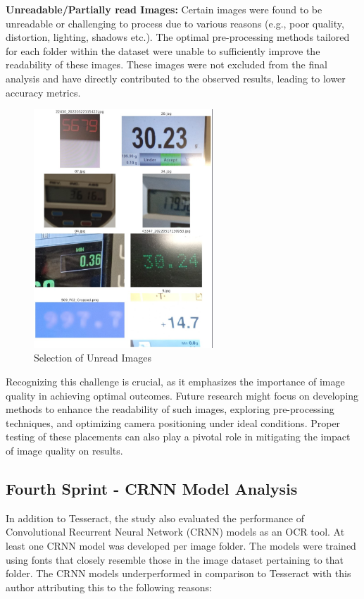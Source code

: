 \textbf{Unreadable/Partially read Images:} Certain images were found to be unreadable or challenging to process due to various reasons (e.g., poor quality, distortion, lighting, shadows etc.). The optimal pre-processing methods tailored for each folder within the dataset were unable to sufficiently improve the readability of these images. These images were not excluded from the final analysis and have directly contributed to the observed results, leading to lower accuracy metrics.

\begin{figure}[ht]
    \centering
    \includegraphics[width=0.6\textwidth]{Figures/discussion/unread_images.jpg}
    \caption[Selection of Unread Images]{Selection of Unread Images}
    \label{fig:Selection of Unread Images}
\end{figure}

Recognizing this challenge is crucial, as it emphasizes the importance of image quality in achieving optimal outcomes. Future research might focus on developing methods to enhance the readability of such images, exploring pre-processing techniques, and optimizing camera positioning under ideal conditions. Proper testing of these placements can also play a pivotal role in mitigating the impact of image quality on results.

\subsection{Fourth Sprint - CRNN Model Analysis}
In addition to Tesseract, the study also evaluated the performance of Convolutional Recurrent Neural Network (CRNN) models as an OCR tool. At least one CRNN model was developed per image folder. The models were trained using fonts that closely resemble those in the image dataset pertaining to that folder. The CRNN models underperformed in comparison to Tesseract with this author attributing this to the following reasons:

